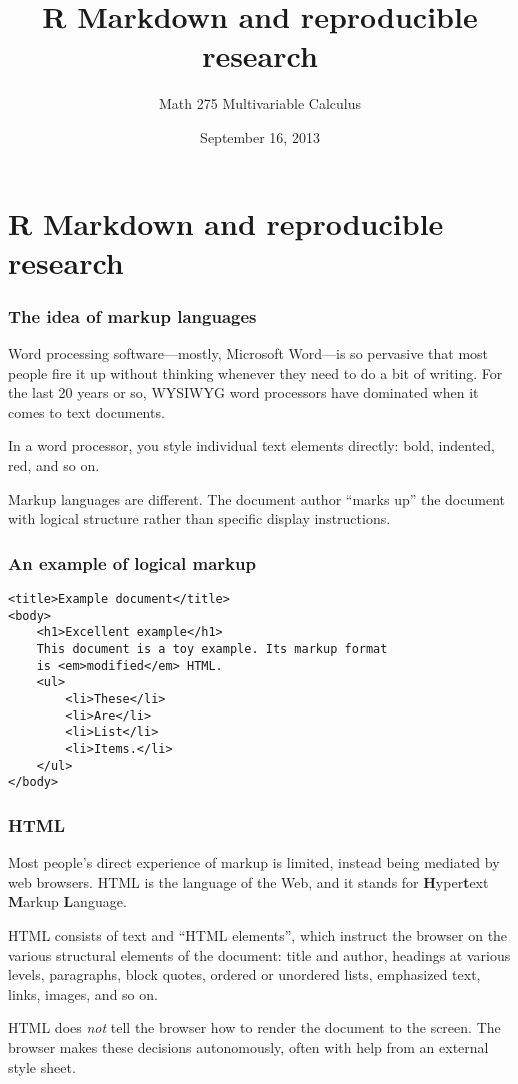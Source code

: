 \documentclass[11pt,ignorenonframetext,aspectratio=169]{beamer}
\title{R Markdown and reproducible research}
\author{Math 275 Multivariable Calculus}
\date{September 16, 2013 }
\begin{document}
\frame{\titlepage}

\section{R Markdown and reproducible research}

\begin{frame}\frametitle{The idea of markup languages}

Word processing software---mostly, Microsoft Word---is so pervasive that
most people fire it up without thinking whenever they need to do a bit
of writing. For the last 20 years or so, WYSIWYG word processors have
dominated when it comes to text documents.

In a word processor, you style individual text elements directly: bold,
indented, red, and so on.

Markup languages are different. The document author ``marks up'' the
document with logical structure rather than specific display
instructions.

\end{frame}

\begin{frame}[fragile]\frametitle{An example of logical markup}

\begin{verbatim}
<title>Example document</title>
<body>
    <h1>Excellent example</h1>
    This document is a toy example. Its markup format
    is <em>modified</em> HTML.
    <ul>
        <li>These</li>
        <li>Are</li>
        <li>List</li>
        <li>Items.</li>
    </ul>
</body>
\end{verbatim}

\end{frame}

\begin{frame}\frametitle{HTML}

Most people's direct experience of markup is limited, instead being
mediated by web browsers. HTML is the language of the Web, and it stands
for \textbf{H}yper\textbf{t}ext \textbf{M}arkup \textbf{L}anguage.

HTML consists of text and ``HTML elements'', which instruct the browser
on the various structural elements of the document: title and author,
headings at various levels, paragraphs, block quotes, ordered or
unordered lists, emphasized text, links, images, and so on.

HTML does \emph{not} tell the browser how to render the document to the
screen. The browser makes these decisions autonomously, often with help
from an external style sheet.

\end{frame}
\end{document}
